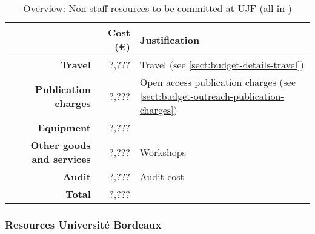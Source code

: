 \bigskip
\begin{table}[H]
\begin{tabular}{|r|r|p{9cm}|}
\hline
\textbf{} & \textbf{Cost (\euro)} & \textbf{Justification} \\\hline
\textbf{Travel} & ?,??? & Travel (see \ref{sect:budget-details-travel})\\\hline
\textbf{Publication charges} & ?,??? & Open access publication charges (see \ref{sect:budget-outreach-publication-charges})\\\hline
\textbf{Equipment} & ?,??? &  \\\hline    %

\textbf{Other goods and services} & ?,??? & Workshops \\\hline   %
\textbf{Audit} & ?,??? & Audit cost \\\hline
\textbf{Total} & ?,???\\\cline{1-2}
\end{tabular}
\caption{Overview: Non-staff resources to be committed at UJF (all in \texteuro)}\vspace*{-1em}
\end{table}




\subsubsection{Resources Universit\'{e} Bordeaux}


